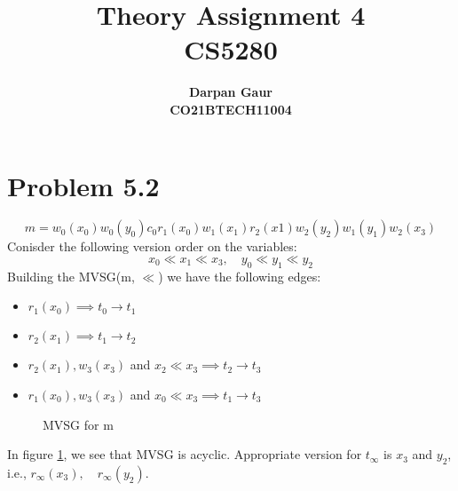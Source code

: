 \documentclass[12pt]{article}
\title{
    \textbf{Theory Assignment 4} \\ 
    \textbf{CS5280} \\
}
\author{
    \textbf{Darpan Gaur} \\
    \textbf{CO21BTECH11004}
}
\date{}
\begin{document}
\maketitle

\hrulefill

\section*{Problem 5.2}
\begin{equation*}
    m = w_0(x_0) w_0(y_0) c_0 r_1(x_0) w_1(x_1) r_2(x1) w_2(y_2) w_1(y_1) w_2(x_3)
\end{equation*}
Conisder the following version order on the variables:
\begin{equation*}
    x_0 \ll x_1 \ll x_3, \quad y_0 \ll y_1 \ll y_2
\end{equation*}
Building the MVSG(m, $\ll$) we have the following edges:
\begin{itemize}
    \item $r_1(x_0) \implies t_0 \rightarrow t_1$
    \item $r_2(x_1) \implies t_1 \rightarrow t_2$
    \item $r_2(x_1), w_3(x_3)$ and $ x_2 \ll x_3 \implies t_2 \rightarrow t_3$
    \item $r_1(x_0), w_3(x_3)$ and $ x_0 \ll x_3 \implies t_1 \rightarrow t_3$
\end{itemize}
\begin{figure}[h]
    \centering
    \caption{MVSG for m}
    \label{fig:mvsg}
\end{figure}
In figure \ref{fig:mvsg}, we see that MVSG is acyclic. Appropriate version for $t_\infty$ is $x_3$ and $y_2$, i.e., $r_\infty(x_3), \quad r_\infty(y_2)$.
\end{document}
